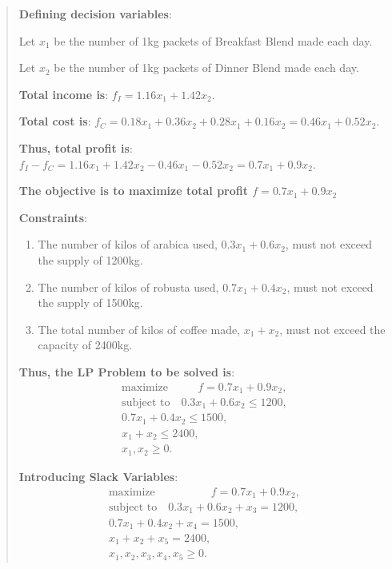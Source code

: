 \documentclass[9pt]{article}
\begin{document}
\vspace{-10pt}
\begin{multicols}{2}
\begin{quote}
    \color{gray}
    \fontsize{7pt}{4pt}\selectfont
    \textbf{Defining decision variables}:

    \quad Let $x_1$ be the number of 1kg packets of Breakfast Blend made each day.

    \quad Let $x_2$ be the number of 1kg packets of Dinner Blend made each day.
    
    \textbf{Total income is}: $f_I = 1.16x_1 + 1.42x_2.$

    \textbf{Total cost is}: $f_C = 0.18x_1 + 0.36x_2 + 0.28x_1 + 0.16x_2 = 0.46x_1 + 0.52x_2.$

    \textbf{Thus, total profit is}:$f_I - f_C = 1.16x_1 + 1.42x_2 - 0.46x_1 - 0.52x_2 = 0.7x_1 + 0.9x_2.$

    \textbf{The objective is to maximize total profit \( f = 0.7x_1 + 0.9x_2 \)}

    \textbf{Constraints}:
    \begin{enumerate}[itemsep=-1pt, topsep=-1pt]
        \item The number of kilos of arabica used, \( 0.3x_1 + 0.6x_2 \), must not exceed the supply of 1200kg.
        \item The number of kilos of robusta used, \( 0.7x_1 + 0.4x_2 \), must not exceed the supply of 1500kg.
        \item The total number of kilos of coffee made, \( x_1 + x_2 \), must not exceed the capacity of 2400kg.
    \end{enumerate}
    
    \textbf{Thus, the LP Problem to be solved is}:
    \[
    \begin{aligned}
        \text{maximize} \qquad \ \ \ f = 0.7x_1 + 0.9x_2, \\
        \text{subject to} \quad 0.3x_1 + 0.6x_2 \leq 1200, \\
        0.7x_1 + 0.4x_2 \leq 1500, \\
        x_1 + x_2 \leq 2400, \\
        x_1, x_2 \geq 0.
    \end{aligned}
    \]
    
    \textbf{Introducing Slack Variables}:  
    \[
    \begin{aligned}
        \text{maximize} \qquad \qquad \quad f = 0.7x_1 + 0.9x_2, \\
        \text{subject to} \quad 0.3x_1 + 0.6x_2 + x_3 = 1200, \\
        0.7x_1 + 0.4x_2 + x_4 = 1500, \\
        x_1 + x_2 + x_5 = 2400, \\
        x_1, x_2, x_3, x_4, x_5 \geq 0.
    \end{aligned}
    \]
\end{quote}
\end{multicols}
\vspace{-10pt}
\end{document}
